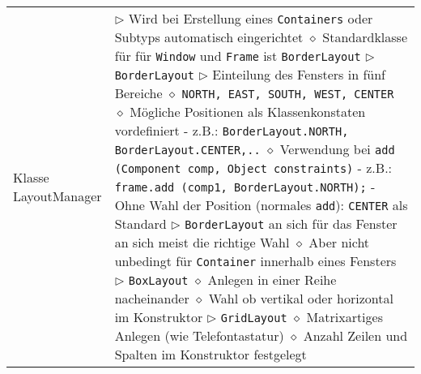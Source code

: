 \begin{longtable}{ | p{} p{} | }
	\makecell[l]{Klasse \\ LayoutManager} & \makecell[l]{
	$\triangleright$ Wird bei Erstellung eines \texttt{Containers} oder Subtyps automatisch eingerichtet \\
	\hspace{0.4cm} $\diamond$ Standardklasse für für \texttt{Window} und \texttt{Frame} ist \texttt{BorderLayout} \\
	$\triangleright$ \texttt{BorderLayout} \\
	$\triangleright$ Einteilung des Fensters in fünf Bereiche \\
	\hspace{0.4cm} $\diamond$ \texttt{NORTH, EAST, SOUTH, WEST, CENTER} \\
	\hspace{0.4cm} $\diamond$ Mögliche Positionen als Klassenkonstaten vordefiniert \\
	\hspace{0.6cm} - z.B.: \texttt{BorderLayout.NORTH, BorderLayout.CENTER,..} \\
	\hspace{0.4cm} $\diamond$ Verwendung bei \texttt{add (Component comp, Object constraints)} \\
	\hspace{0.6cm} - z.B.: \texttt{frame.add (comp1, BorderLayout.NORTH);} \\
	\hspace{0.6cm} - Ohne Wahl der Position (normales \texttt{add}): \texttt{CENTER} als Standard \\
	$\triangleright$ \texttt{BorderLayout} an sich für das Fenster an sich meist die richtige Wahl \\
	\hspace{0.4cm} $\diamond$ Aber nicht unbedingt für \texttt{Container} innerhalb eines Fensters \\
	$\triangleright$ \texttt{BoxLayout} \\ 
	\hspace{0.4cm} $\diamond$ Anlegen in einer Reihe nacheinander \\
	\hspace{0.4cm} $\diamond$ Wahl ob vertikal oder horizontal im Konstruktor \\
	$\triangleright$ \texttt{GridLayout} \\
	\hspace{0.4cm} $\diamond$ Matrixartiges Anlegen (wie Telefontastatur) \\
	\hspace{0.4cm} $\diamond$ Anzahl Zeilen und Spalten im Konstruktor festgelegt \\
}
\end{longtable}

